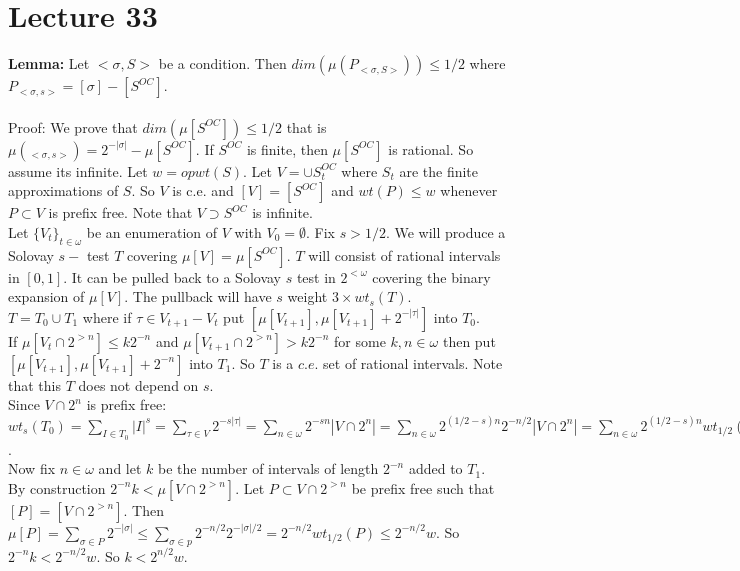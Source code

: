 \documentclass{article}
\begin{document}
   \section{Lecture 33}
   \textbf{Lemma:} Let $<\sigma,S>$ be a condition. Then $dim(\mu(P_{<\sigma,S>})) \leq 1/2$ where $P_{<\sigma,s>} = [\sigma] - [S^{OC}]$. \\\\
   Proof: We prove that $dim(\mu[S^{OC}]) \leq 1/2$ that is $\mu(_{<\sigma,s>}) = 2^{-|\sigma| }- \mu[S^{O C}]$. If $S^{OC}$ is finite, then $\mu[S^{OC}]$ is rational. So assume its infinite. Let $ w = opwt(S)$. Let $V = \cup S_t^{OC}$ where $S_t$ are the finite approximations of $S$. So $V$ is c.e. and $[V] = [S^{OC}]$ and $wt(P) \leq w$ whenever $P \subset V$ is prefix free. Note that $V \supset S^{OC}$ is infinite. \\
   Let $\{V_t\}_{t \in \omega}$ be an enumeration of $V$ with $V_0 = \emptyset$. Fix $s > 1/2$. We will produce a Solovay $s-$ test $T$ covering $\mu[V] = \mu[S^{OC}]$. $T$ will consist of rational intervals in $[0,1]$. It can be pulled back to a Solovay $s$ test in $2^{<\omega}$ covering the binary expansion of $\mu[V]$. The pullback will have $s$ weight $3\times wt_s(T)$.\\
   $T = T_0 \cup T_1$ where if $\tau \in V_{t+1} - V_t$ put $[\mu[V_{t+1}], \mu[V_{t+1}] + 2^{-|\tau|}]$ into $T_0$. \\
   If $\mu[V_t \cap 2^{>n}]\leq k 2^{-n}$ and $\mu[V_{t+1}\cap 2^{>n}]> k2^{-n}$ for some $k,n \in \omega$ then put $[\mu[V_{t+1}], \mu[V_{t+1}]+2^{-n}]$ into $T_1$. So $T$ is a $c.e.$ set of rational intervals. Note that this $T$ does not depend on $s$. \\
   Since $V \cap 2^n$ is prefix free: \\
   $wt_s(T_0) = \sum_{I\in T_0} |I|^s = \sum_{\tau \in V} 2^{-s|\tau|} = \sum_{n \in \omega} 2^{-sn}|V \cap 2^n| = \sum_{n \in \omega} 2^{(1/2 -s)n} 2^{-n/2} |V \cap 2^n| = \sum_{n \in \omega} 2^{(1/2-s)n} wt_{1/2}(V\cap 2^n ) \leq \sum_{n \in \omega} 2^{(1/2 -s )n} w < \infty$. \\
   Now fix $n \in \omega$ and let $k$ be the number of intervals of length $2^{-n}$ added to $T_1$.\\
   By construction $2^{-n}k < \mu[V\cap 2^{>n}]$. Let $P \subset V \cap 2^{>n}$ be prefix free such that $[P] = [V \cap 2^{>n}]$. Then $\mu[P] = \sum_{\sigma \in P} 2^{-|\sigma| } \leq \sum_{\sigma \in p} 2^{-n/2} 2^{-|\sigma|/2}= 2^{-n/2} wt_{1/2}(P) \leq 2^{-n/2} w$. So $2^{-n}k < 2^{-n/2}w $. So $k < 2^{n/2}w$. \\
\end{document}
